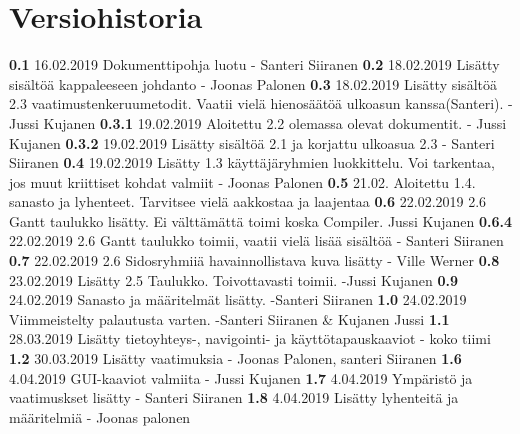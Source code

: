 \chapter*{Versiohistoria}

\newcommand{\currentversion}{1.8} %

\textbf{0.1} 16.02.2019 Dokumenttipohja luotu - Santeri Siiranen \newline
\textbf{0.2} 18.02.2019 Lisätty sisältöä kappaleeseen johdanto - Joonas Palonen \newline
\textbf{0.3} 18.02.2019 Lisätty sisältöä 2.3 vaatimustenkeruumetodit. Vaatii vielä hienosäätöä ulkoasun kanssa(Santeri). - Jussi Kujanen \newline
\textbf{0.3.1} 19.02.2019 Aloitettu 2.2 olemassa olevat dokumentit. - Jussi Kujanen \newline
\textbf{0.3.2} 19.02.2019 Lisätty sisältöä 2.1 ja korjattu ulkoasua 2.3 - Santeri Siiranen \newline
\textbf{0.4} 19.02.2019 Lisätty 1.3 käyttäjäryhmien luokkittelu. Voi tarkentaa, jos muut kriittiset kohdat valmiit - Joonas Palonen \newline
\textbf{0.5} 21.02. Aloitettu 1.4. sanasto ja lyhenteet. Tarvitsee vielä aakkostaa ja laajentaa \newline
\textbf{0.6} 22.02.2019 2.6 Gantt taulukko lisätty. Ei välttämättä toimi koska Compiler. Jussi Kujanen \newline
\textbf{0.6.4} 22.02.2019 2.6 Gantt taulukko toimii, vaatii vielä lisää sisältöä - Santeri Siiranen \newline
\textbf{0.7} 22.02.2019 2.6 Sidosryhmiiä havainnollistava kuva lisätty - Ville Werner \newline
\textbf{0.8} 23.02.2019 Lisätty 2.5 Taulukko. Toivottavasti toimii. -Jussi Kujanen \newline
\textbf{0.9} 24.02.2019 Sanasto ja määritelmät lisätty. -Santeri Siiranen \newline
\textbf{1.0} 24.02.2019 Viimmeistelty palautusta varten. -Santeri Siiranen \& Kujanen Jussi \newline 
\textbf{1.1} 28.03.2019 Lisätty tietoyhteys-, navigointi- ja käyttötapauskaaviot - koko tiimi \newline
\textbf{1.2} 30.03.2019 Lisätty vaatimuksia - Joonas Palonen, santeri Siiranen\newline 
\textbf{1.6} 4.04.2019 GUI-kaaviot valmiita - Jussi Kujanen\newline 
\textbf{1.7} 4.04.2019 Ympäristö ja vaatimuskset lisätty - Santeri Siiranen\newline 
\textbf{1.8} 4.04.2019 Lisätty lyhenteitä ja määritelmiä - Joonas palonen\newline 
